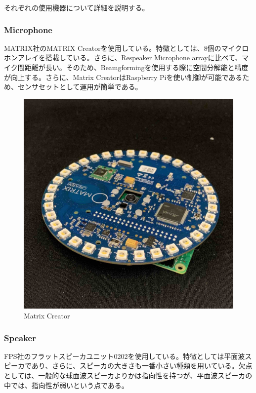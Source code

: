 \clearpage

それぞれの使用機器について詳細を説明する。
\subsubsection{Microphone}
MATRIX社のMATRIX Creatorを使用している。特徴としては、8個のマイクロホンアレイを搭載している。さらに、Respeaker Microphone arrayに比べて、マイク間距離が長い。そのため、Beamgformingを使用する際に空間分解能と精度が向上する。さらに、Matrix CreatorはRaspberry Piを使い制御が可能であるため、センサセットとして運用が簡単である。

\begin{figure}[tb]
  \begin{center}
  \vspace{1zh}
    \includegraphics[width=0.7\linewidth]{images/5_matrix_creator.jpg}   
  \end{center}
  \caption{Matrix Creator}
  \label{fig:hand_hard_matrix}
\end{figure}

\subsubsection{Speaker}
FPS社のフラットスピーカユニット0202を使用している。特徴としては平面波スピーカであり、さらに、スピーカの大きさも一番小さい種類を用いている。欠点としては、一般的な球面波スピーカよりかは指向性を持つが、平面波スピーカの中では、指向性が弱いという点である。

